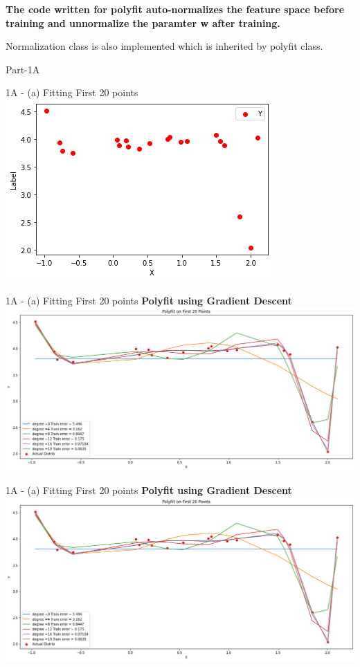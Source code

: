 \documentclass[11pt]{beamer}
\begin{document}
\begin{frame}
\textbf{The code written for polyfit auto-normalizes the feature space before training and unnormalize the paramter w after training.}

Normalization class is also implemented which is inherited by polyfit class.
\end{frame}


\begin{frame}
\begin{huge}
Part-1A
\end{huge}
\end{frame}
\begin{frame}{1A - (a) Fitting First 20 points}
\includegraphics[scale=0.5]{images/plot20points.png} 
\end{frame}


\begin{frame}{1A - (a) Fitting First 20 points}
\textbf{Polyfit using Gradient Descent}
\includegraphics[scale=0.3]{images/polyfitgradientdescent.png}
\end{frame}

\begin{frame}{1A - (a) Fitting First 20 points}
\textbf{Polyfit using Gradient Descent}
\includegraphics[scale=0.3]{images/polyfitgradientdescent.png}
\end{frame}
\end{document}

